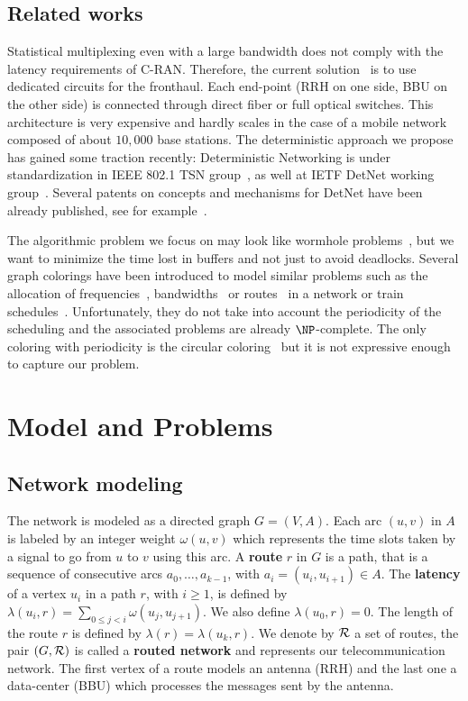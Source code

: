 \documentclass[10pt, conference, letterpaper]{IEEEtran}
\begin{document}
   \subsection*{Related works}
   
 Statistical multiplexing even with a large bandwidth does not comply with the latency requirements of C-RAN. Therefore, the current solution~\cite{pizzinat2015things,tayq2017real} is to use dedicated circuits for the fronthaul. Each end-point (RRH on one side, BBU on the other side) is connected through direct fiber or full optical switches. This architecture is very expensive and hardly scales in the case of a mobile network composed of about $10,000$ base stations. The deterministic approach we propose has gained some traction recently: Deterministic Networking is under standardization in IEEE 802.1 TSN group~\cite{finn-detnet-architecture-08}, as well at IETF DetNet working group~\cite{ieee802}. Several patents on concepts and mechanisms for DetNet have been already published, see for example~\cite{howe2005time,leclerc2016transmission}. 
     
The algorithmic problem we focus on may look like wormhole problems~\cite{cole1996benefit}, but  we want to minimize the time lost in buffers and not just to avoid deadlocks. Several graph colorings have been introduced to model similar problems such as the allocation of frequencies~\cite{borndorfer1998frequency}, bandwidths~\cite{erlebach2001complexity} or routes~\cite{cole1996benefit} in a network or train schedules~\cite{strotmann2007railway}. Unfortunately, they do not take into account the periodicity of the scheduling and the associated problems are already $\NP$-complete. The only coloring with periodicity is the circular coloring~\cite{zhou2013multiple} but it is not expressive enough to capture our problem.

\section{Model and Problems}\label{sec:def}

  \subsection{Network modeling}
  

The network is modeled as a directed graph $G=(V,A)$. Each arc  $(u,v)$ in $A$ is labeled by an integer weight $\omega(u,v)$ which represents the time slots taken by a signal to go from $u$ to $v$ using this arc. A {\bf route} $r$ in $G$ is a path, that is a sequence of consecutive arcs $a_0, \ldots , a_{k-1}$, with $a_i=(u_i,u_{i+1}) \in A$.  The {\bf latency} of a vertex $u_i$ in a path $r$, with $i \geq 1$, is defined by $\lambda(u_i,r)= \sum\limits_{0 \leq j <i} \omega(u_j, u_{j+1})$. We also define $\lambda(u_0,r)=0$. The length of the route $r$ is defined by $\lambda (r)= \lambda (u_k,r)$.
We denote by $\cal R$ a set of routes, the pair $(G,\cal R)$ is called a {\bf routed network} and represents our telecommunication network.
The first vertex of a route models an antenna (RRH) and the last one a data-center (BBU) which processes the messages sent by the antenna.
\end{document}
